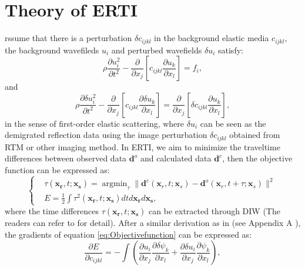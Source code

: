 \section{Theory of ERTI}
rssume that there is a perturbation $\delta c_{ijkl}$ in the background elastic media
$c_{ijkl}$, the background wavefileds $u_i$ and perturbed wavefields
$\delta u_i$ satisfy:
\begin{equation}
    \rho \frac{\partial u^2_i}{\partial t^2}  -
    \frac{\partial}{\partial x_j}\left[ 
        c_{ijkl}\frac{\partial u_{k}}{\partial
        x_l}\right]=f_i,
    \label{eq:WE} 
\end{equation}
and
\begin{equation}
    \rho \frac{\partial \delta u^2_i}{\partial t^2}  -
    \frac{\partial}{\partial x_j}\left[ 
        c_{ijkl}\frac{\partial \delta u_{k}}{\partial
        x_l}\right]=\frac{\partial}{\partial x_j}\left[\delta c_{ijkl}\frac{\partial u_{k}}{\partial x_l}\right],
    \label{eq:DeltaWE} 
\end{equation}
in the sense of first-order elastic scattering, where $\delta u_i$ can be seen as the demigrated reflection data using the image
perturbation $\delta c_{ijkl}$ obtained from RTM or other imaging method. In ERTI, we
aim to minimize the traveltime differences between observed data
$\mathbf{d}^{o}$ and
calculated data $\mathbf{d}^{c}$, then
the objective function can be expressed as:
\begin{equation}
	\left\{
		\begin{aligned}
			&\tau(\mathbf{x_r},t;\mathbf{x_s})=\mathop{\arg\min}_{\tau}
			\parallel\mathbf{d}^{c}(\mathbf{x}_r,t;\mathbf{x}_s)-\mathbf{d}^{o}(\mathbf{x}_r,t+\tau;\mathbf{x}_s)\parallel^2\\
    &E=\frac{1}{2}\int\tau^2(\mathbf{x_r},t;\mathbf{x_s})dtd\mathbf{x_r}d\mathbf{x_s},
		\end{aligned}
	\right.
    \label{eq:Objectivefunction} 
\end{equation}
where the time differences $\tau(\mathbf{x_r},t;\mathbf{x_s})$ can be extracted
through DIW (The readers can refer to \cite{Hale2013} for detail).
After a similar derivation as in \cite{Ma2013} (see Appendix A ), the gradients of equation \eqref{eq:Objectivefunction} can be expressed as:
\begin{equation}
	\frac{\partial E}{\partial c_{ijkl}}=-\int (\frac{\partial u_{i}}{\partial
	x_j}\frac{\partial \delta \psi_{k}}{\partial x_l}+\frac{\partial \delta u_{i}}{\partial
	x_j}\frac{\partial \psi_{k}}{\partial x_l}),
    \label{eq:GradientCijkl}
\end{equation}
